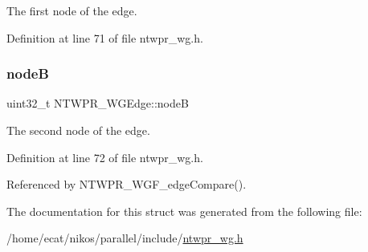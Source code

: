 The first node of the edge. 

Definition at line 71 of file ntwpr\+\_\+wg.\+h.

\mbox{\label{structNTWPR__WGEdge_a0f9b43039574824cc76908125ad3661d}} 
\subsubsection{\texorpdfstring{nodeB}{nodeB}}
{\footnotesize\ttfamily uint32\+\_\+t N\+T\+W\+P\+R\+\_\+\+W\+G\+Edge\+::nodeB}

The second node of the edge. 

Definition at line 72 of file ntwpr\+\_\+wg.\+h.



Referenced by N\+T\+W\+P\+R\+\_\+\+W\+G\+F\+\_\+edge\+Compare().



The documentation for this struct was generated from the following file\+:\begin{DoxyCompactItemize}
\item 
/home/ecat/nikos/parallel/include/\mbox{\hyperlink{ntwpr__wg_8h}{ntwpr\+\_\+wg.\+h}}\end{DoxyCompactItemize}
